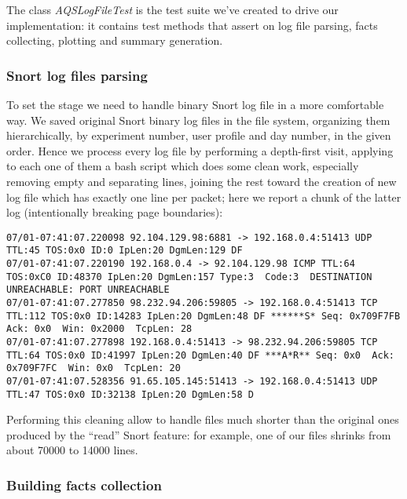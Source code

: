 \documentclass[10pt,a4paper]{article}
\begin{document}
    The class \emph{AQSLogFileTest} is the test suite we've created to
    drive our implementation: it contains test methods that assert on
    log file parsing, facts collecting, plotting and summary
    generation.

    \subsubsection{Snort log files parsing}

    To set the stage we need to handle binary Snort log file in a more
    comfortable way. We saved original Snort binary log files in the
    file system, organizing them hierarchically, by experiment number,
    user profile and day number, in the given order. Hence we process
    every log file by performing a depth-first visit, applying to each
    one of them a bash script which does some clean work, especially
    removing empty and separating lines, joining the rest toward the
    creation of new log file which has exactly one line per packet;
    here we report a chunk of
    the latter log (intentionally breaking page boundaries): 
    \begin{adjustwidth}{-4cm}{}
\begin{verbatim}
07/01-07:41:07.220098 92.104.129.98:6881 -> 192.168.0.4:51413 UDP TTL:45 TOS:0x0 ID:0 IpLen:20 DgmLen:129 DF
07/01-07:41:07.220190 192.168.0.4 -> 92.104.129.98 ICMP TTL:64 TOS:0xC0 ID:48370 IpLen:20 DgmLen:157 Type:3  Code:3  DESTINATION UNREACHABLE: PORT UNREACHABLE
07/01-07:41:07.277850 98.232.94.206:59805 -> 192.168.0.4:51413 TCP TTL:112 TOS:0x0 ID:14283 IpLen:20 DgmLen:48 DF ******S* Seq: 0x709F7FB  Ack: 0x0  Win: 0x2000  TcpLen: 28
07/01-07:41:07.277898 192.168.0.4:51413 -> 98.232.94.206:59805 TCP TTL:64 TOS:0x0 ID:41997 IpLen:20 DgmLen:40 DF ***A*R** Seq: 0x0  Ack: 0x709F7FC  Win: 0x0  TcpLen: 20
07/01-07:41:07.528356 91.65.105.145:51413 -> 192.168.0.4:51413 UDP TTL:47 TOS:0x0 ID:32138 IpLen:20 DgmLen:58 D
\end{verbatim}
    \end{adjustwidth}

    Performing this cleaning allow to handle files much shorter than
    the original ones produced by the ``read'' Snort feature: for
    example, one of our files shrinks from about 70000 to 14000 lines.

    \subsubsection{Building facts collection}
\end{document}

